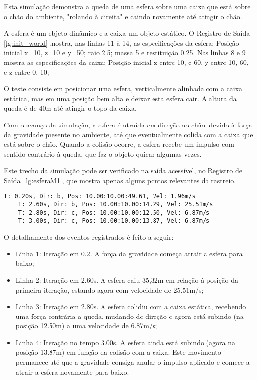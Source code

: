 \documentclass[12pt]{article}
\begin{document}
Esta simulação demonstra a queda de uma esfera sobre uma caixa que está sobre o chão do ambiente, "rolando à direita" e caindo novamente até atingir o chão. 

A esfera é um objeto dinâmico e a caixa um objeto estático. O Registro de Saída \ref{lg:init_world} mostra, nas linhas 11 à 14, as especificações da esfera: Posição inicial x=10, z=10 e y=50; raio 2.5; massa 5 e restituição 0.25. Nas linhas 8 e 9 mostra as especificações da caixa: Posição inicial x entre 10, e 60, y entre 10, 60, e z entre 0, 10;

O teste consiste em posicionar uma esfera, verticalmente alinhada com a caixa estática, mas em uma posição bem alta e deixar esta esfera cair. A altura da queda é de 40m até atingir o topo da caixa.

Com o avanço da simulação, a esfera é atraída em direção ao chão, devido à força da gravidade presente no ambiente, até que eventualmente colida com a caixa  que está sobre o chão. Quando a colisão ocorre, a esfera recebe um impulso com sentido contrário à queda, que faz o objeto quicar algumas vezes. 

Este trecho da simulação pode ser verificado na saída acessível, no Registro de Saída~\ref{lg:esferaM1}, que mostra apenas alguns pontos relevantes do rastreio.

\begin{lstlisting}[frame=single,caption=Queda da esfera. \label{lg:esferaM1}]
	T: 0.20s, Dir: b, Pos: 10.00:10.00:49.61, Vel: 1.96m/s
	T: 2.60s, Dir: b, Pos: 10.00:10.00:14.29, Vel: 25.51m/s
	T: 2.80s, Dir: c, Pos: 10.00:10.00:12.50, Vel: 6.87m/s
	T: 3.00s, Dir: c, Pos: 10.00:10.00:13.87, Vel: 6.87m/s
\end{lstlisting}

O detalhamento dos eventos registrados é feito a seguir:
\begin{itemize}
	\item Linha 1: Iteração em 0.2. A força da gravidade começa atrair a esfera para baixo;
	\item Linha 2: Iteração em 2.60s. A esfera caiu 35,32m em relação à posição da primeira iteração, estando agora com velocidade de 25.51m/s;
	\item Linha 3: Iteração em 2.80s. A esfera colidiu com a caixa estática, recebendo uma força contrária a queda, mudando de direção e agora está subindo (na posição 12.50m) a uma velocidade de 6.87m/s; 
	\item Linha 4: Iteração no tempo 3.00s. A esfera ainda está subindo (agora na posição 13.87m) em função da colisão com a caixa. Este movimento permanece até que a gravidade consiga anular o impulso aplicado e comece a atrair a esfera novamente para baixo.
\end{itemize}
\end{document}
